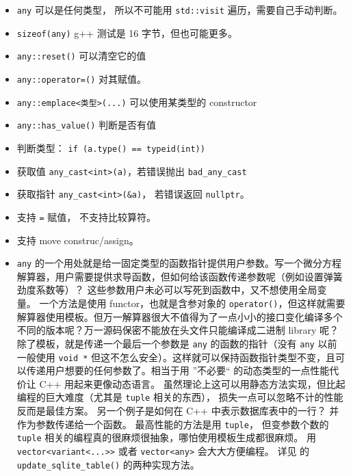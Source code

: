 \begin{itemize}
\item \verb`any` 可以是任何类型， 所以不可能用 \verb`std::visit` 遍历，需要自己手动判断。
\item \verb`sizeof(any)` g++ 测试是 16 字节，但也可能更多。
\item \verb`any::reset()` 可以清空它的值
\item \verb`any::operator=()` 对其赋值。
\item \verb`any::emplace<类型>(...)` 可以使用某类型的 constructor
\item \verb`any::has_value()` 判断是否有值
\item 判断类型： \verb`if (a.type() == typeid(int))`
\item 获取值 \verb`any_cast<int>(a)`，若错误抛出 \verb`bad_any_cast`
\item 获取指针 \verb`any_cast<int>(&a)`， 若错误返回 \verb`nullptr`。
\item 支持 \verb`=` 赋值， 不支持比较算符。
\item 支持 move construc/assign。
\item \verb`any` 的一个用处就是给一固定类型的函数指针提供用户参数。写一个微分方程解算器，用户需要提供求导函数，但如何给该函数传递参数呢（例如设置弹簧劲度系数等）？ 这些参数用户未必可以写死到函数中，又不想使用全局变量。 一个方法是使用 functor，也就是含参对象的 \verb`operator()`，但这样就需要解算器使用模板。但万一解算器很大不值得为了一点小小的接口变化编译多个不同的版本呢？万一源码保密不能放在头文件只能编译成二进制 library 呢？ 除了模板，就是传递一个最后一个参数是 \verb`any` 的函数的指针（没有 \verb`any` 以前一般使用 \verb`void *` 但这不怎么安全）。这样就可以保持函数指针类型不变，且可以传递用户想要的任何参数了。相当于用 ”不必要“ 的动态类型的一点性能代价让 C++ 用起来更像动态语言。 虽然理论上这可以用静态方法实现，但比起编程的巨大难度（尤其是 \verb`tuple` 相关的东西）， 损失一点可以忽略不计的性能反而是最佳方案。 另一个例子是如何在 C++ 中表示数据库表中的一行？ 并作为参数传递给一个函数。 最高性能的方法是用 \verb`tuple`， 但变参数个数的 \verb`tuple` 相关的编程真的很麻烦很抽象，哪怕使用模板生成都很麻烦。 用 \verb`vector<variant<...>>` 或者 \verb`vector<any>` 会大大方便编程。 详见  的 \verb`update_sqlite_table()` 的两种实现方法。
\end{itemize}
